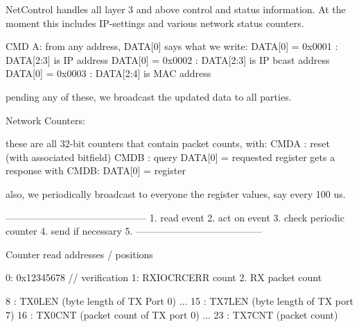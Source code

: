 NetControl handles all layer 3 and above control and status
information. At the moment this includes IP-settings and various
network status counters.

CMD A: from any address, DATA[0] says what we write:
    DATA[0] = 0x0001 : DATA[2:3] is IP address
    DATA[0] = 0x0002 : DATA[2:3] is IP bcast address
    DATA[0] = 0x0003 : DATA[2:4] is MAC address

pending any of these, we broadcast the updated data to all parties. 

Network Counters:

these are all 32-bit counters that contain packet counts, with: 
CMDA : reset (with associated bitfield)
CMDB : query DATA[0] = requested register
   gets a response with 
   CMDB: DATA[0] = register

   also, we periodically broadcast to everyone the register values,
   say every 100 us.


--------------------------------------------
1. read event
2. act on event
3. check periodic counter
4. send if necessary
5. 
---------------------------------------

Counter read addresses / positions

0: 0x12345678 // verification
1: RXIOCRCERR count
2. RX packet count

8 : TX0LEN (byte length of TX Port 0)
...
15 : TX7LEN (byte length of TX port 7)
16 : TX0CNT (packet count of TX port 0)
...
23 : TX7CNT (packet count)
